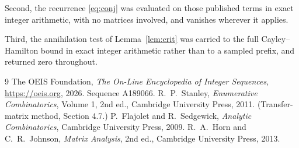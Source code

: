 \documentclass[11pt,a4paper]{article}
\theoremstyle{plain}
\theoremstyle{definition}
\begin{document}
Second, the recurrence \eqref{eq:conj} was evaluated on those published terms in exact
integer arithmetic, with no matrices involved, and vanishes wherever it applies.

Third, the annihilation test of Lemma~\ref{lem:crit} was carried to the full
Cayley--Hamilton bound in exact integer arithmetic rather than to a sampled prefix, and
returned zero throughout.

\begin{thebibliography}{9}
 The OEIS Foundation, \emph{The On-Line Encyclopedia of Integer
Sequences}, \url{https://oeis.org}, 2026. Sequence A189066.
 R.~P.~Stanley, \emph{Enumerative Combinatorics}, Volume 1, 2nd ed.,
Cambridge University Press, 2011. (Transfer-matrix method, Section 4.7.)
 P.~Flajolet and R.~Sedgewick, \emph{Analytic Combinatorics}, Cambridge
University Press, 2009.
 R.~A.~Horn and C.~R.~Johnson, \emph{Matrix Analysis}, 2nd ed., Cambridge
University Press, 2013.
\end{thebibliography}
\end{document}
